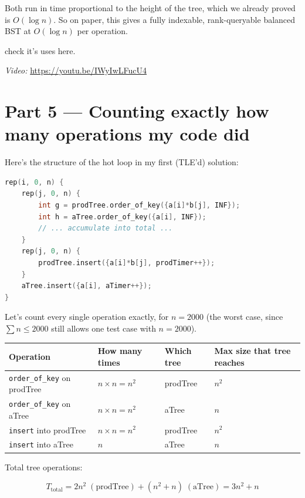 \documentclass[11pt,a4paper]{article}
\begin{document}
Both run in time proportional to the height of the tree, which we already proved is $O(\log n)$. So on paper, this gives a fully indexable, rank-queryable balanced BST at $O(\log n)$ per operation.

check it's uses here.

\noindent\textit{Video:} \url{https://youtu.be/IWyIwLFucU4}

\section{Part 5 --- Counting exactly how many operations my code did}

Here's the structure of the hot loop in my first (TLE'd) solution:

\begin{lstlisting}[language=C++]
rep(i, 0, n) {
    rep(j, 0, n) {
        int g = prodTree.order_of_key({a[i]*b[j], INF});
        int h = aTree.order_of_key({a[i], INF});
        // ... accumulate into total ...
    }
    rep(j, 0, n) {
        prodTree.insert({a[i]*b[j], prodTimer++});
    }
    aTree.insert({a[i], aTimer++});
}
\end{lstlisting}

Let's count every single operation exactly, for $n = 2000$ (the worst case, since $\sum n \le 2000$ still allows one test case with $n=2000$).

\begin{center}\small
\begin{tabularx}{\linewidth}{>{\raggedright\arraybackslash}X>{\raggedright\arraybackslash}X>{\raggedright\arraybackslash}X>{\raggedright\arraybackslash}X}
\toprule
\textbf{Operation} & \textbf{How many times} & \textbf{Which tree} & \textbf{Max size that tree reaches} \\
\midrule
\texttt{order\_of\_key} on prodTree & $n \times n = n^2$ & prodTree & $n^2$ \\
\texttt{order\_of\_key} on aTree & $n \times n = n^2$ & aTree & $n$ \\
\texttt{insert} into prodTree & $n \times n = n^2$ & prodTree & $n^2$ \\
\texttt{insert} into aTree & $n$ & aTree & $n$ \\
\bottomrule
\end{tabularx}
\end{center}

Total tree operations:


\[
T_{\text{total}} = 2n^2 \;(\text{prodTree}) + (n^2 + n)\;(\text{aTree}) = 3n^2 + n
\]
\end{document}
